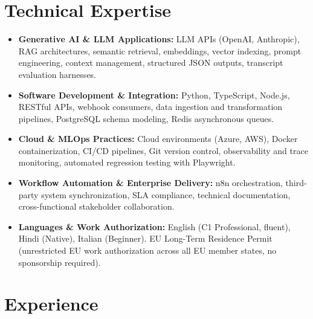 \documentclass[10pt,a4paper]{article}
\begin{document}
\section{Technical Expertise}
\begin{itemize}
  \item \textbf{Generative AI \& LLM Applications:} LLM APIs (OpenAI, Anthropic), RAG architectures, semantic retrieval, embeddings, vector indexing, prompt engineering, context management, structured JSON outputs, transcript evaluation harnesses.
  \item \textbf{Software Development \& Integration:} Python, TypeScript, Node.js, RESTful APIs, webhook consumers, data ingestion and transformation pipelines, PostgreSQL schema modeling, Redis asynchronous queues.
  \item \textbf{Cloud \& MLOps Practices:} Cloud environments (Azure, AWS), Docker containerization, CI/CD pipelines, Git version control, observability and trace monitoring, automated regression testing with Playwright.
  \item \textbf{Workflow Automation \& Enterprise Delivery:} n8n orchestration, third-party system synchronization, SLA compliance, technical documentation, cross-functional stakeholder collaboration.
  \item \textbf{Languages \& Work Authorization:} English (C1 Professional, fluent), Hindi (Native), Italian (Beginner). EU Long-Term Residence Permit (unrestricted EU work authorization across all EU member states, no sponsorship required).
\end{itemize}

\section{Experience}
\end{document}
